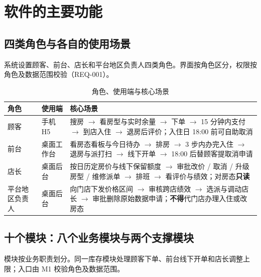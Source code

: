 \section{软件的主要功能}

\subsection{四类角色与各自的使用场景}

系统设置顾客、前台、店长和平台地区负责人四类角色。界面按角色区分，权限按角色及数据范围校验（REQ-001）。

\begin{table}[H]
\centering
\caption{角色、使用端与核心场景}
\tabfont
\begin{tabularx}{\textwidth}{@{}L{2.6cm}L{2.8cm}X@{}}
\toprule
角色 & 使用端 & 核心场景 \\
\midrule
顾客 & 手机 H5 & 搜房 $\rightarrow$ 看房型与实时余量 $\rightarrow$ 下单 $\rightarrow$ 15 分钟内支付 $\rightarrow$ 到店入住 $\rightarrow$ 退房后评价；入住日 18:00 前可自助取消 \\
前台 & 桌面工作台 & 看房态看板与今日待办 $\rightarrow$ 排房 $\rightarrow$ 3 步内办完入住 $\rightarrow$ 退房与派打扫 $\rightarrow$ 线下开单 $\rightarrow$ 18:00 后替顾客提取消申请 \\
店长 & 桌面后台 & 按日历定房价与线下保留额度 $\rightarrow$ 审批改价 / 取消 / 升级房型 / 维修派单 $\rightarrow$ 排班 $\rightarrow$ 看评价与绩效；对房态\textbf{只读} \\
平台地区负责人 & 桌面后台 & 向门店下发价格区间 $\rightarrow$ 审核跨店绩效 $\rightarrow$ 选派与调动店长 $\rightarrow$ 审批删除原始数据申请；\textbf{不得}代门店办理入住或改房态 \\
\bottomrule
\end{tabularx}
\end{table}

\subsection{十个模块：八个业务模块与两个支撑模块}

模块按业务职责划分。同一库存模块处理顾客下单、前台线下开单和店长调整上限；入口由 M1 校验角色及数据范围。

